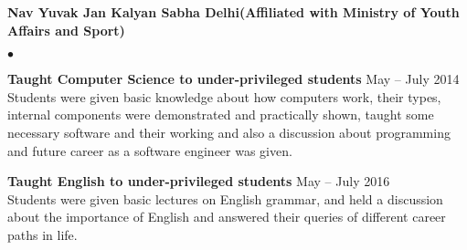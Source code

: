 \documentclass[margin,line]{res}
\newenvironment{list2}{
  \begin{list}{$\bullet$}{%
      \setlength{\itemsep}{0in}
      \setlength{\parsep}{0in} \setlength{\parskip}{0in}
      \setlength{\topsep}{0in} \setlength{\partopsep}{0in}
      \setlength{\leftmargin}{0.2in}}}{\end{list}}
\begin{document}
\begin{resume}
{\bf Nav Yuvak Jan Kalyan Sabha Delhi(Affiliated with Ministry of Youth Affairs and Sport)}\\
\begin{list2}
\item {\bf Taught   Computer Science  to under-privileged students } \hfill May -- July 2014 \\
Students were given basic knowledge about how computers work, their types, internal components were demonstrated and practically shown, taught some necessary software and their working and also a discussion about programming and future career as a software engineer was given.
\item {\bf Taught  English  to under-privileged students}   \hfill May -- July 2016 \\
Students were given basic lectures on English grammar, and held a discussion about the importance of English and answered their queries of different career paths in life.
\end{list2}

\end{resume}
\end{document}
